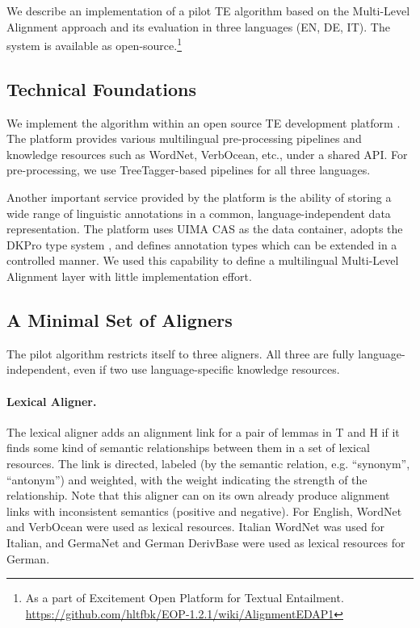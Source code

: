 \documentclass[11pt,letterpaper]{article}
\begin{document}
We describe an implementation of a pilot TE algorithm based on the
Multi-Level Alignment approach and its evaluation in three languages
(EN, DE, IT). The system is available as
open-source.\footnote{As a part of Excitement Open Platform for Textual Entailment. \url{https://github.com/hltfbk/EOP-1.2.1/wiki/AlignmentEDAP1}} 


\subsection{Technical Foundations}  
\label{sec:techn-found}

We implement the algorithm within an open source TE development
platform \cite{EOP-arch}. The platform provides various multilingual
pre-processing pipelines and knowledge resources such as WordNet,
VerbOcean, etc., under a shared API. For pre-processing, we use
TreeTagger-based pipelines for all three languages.

Another important service provided by the platform is the
ability of storing a wide range of linguistic annotations in a common,
language-independent data representation. The platform uses UIMA CAS
\cite{d04:_uima} as the data container, adopts the DKPro type system
\cite{DKpro}, and defines annotation types which can be extended in a
controlled manner. We used this capability to define a multilingual
Multi-Level Alignment layer  %
with little implementation effort.

\subsection{A Minimal Set of Aligners}

The pilot algorithm restricts itself to three aligners.  All three are
fully language-independent, even if two use
language-specific knowledge resources.

\paragraph{Lexical Aligner.} The lexical aligner adds an alignment link
for a pair of lemmas in T and H if it finds some kind of semantic
relationships between them in a set of lexical resources. The link is
directed, labeled (by the semantic relation, e.g. ``synonym'',
``antonym'') and weighted, with the weight indicating the strength of
the relationship. Note that this aligner can on its own already
produce alignment links with inconsistent semantics (positive and
negative). For English, WordNet and VerbOcean were used as lexical
resources. Italian WordNet was used for Italian, and GermaNet and
German DerivBase \cite{Zeller:2013} were used as lexical resources for
German.
\end{document}
